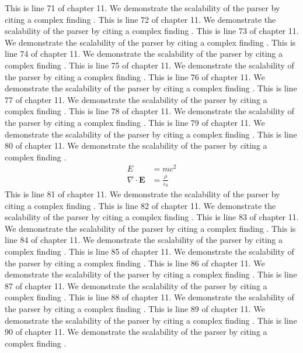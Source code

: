 This is line 71 of chapter 11. We demonstrate the scalability of the parser by citing a complex finding \cite{ref11_71}.
This is line 72 of chapter 11. We demonstrate the scalability of the parser by citing a complex finding \cite{ref11_72}.
This is line 73 of chapter 11. We demonstrate the scalability of the parser by citing a complex finding \cite{ref11_73}.
This is line 74 of chapter 11. We demonstrate the scalability of the parser by citing a complex finding \cite{ref11_74}.
This is line 75 of chapter 11. We demonstrate the scalability of the parser by citing a complex finding \cite{ref11_75}.
This is line 76 of chapter 11. We demonstrate the scalability of the parser by citing a complex finding \cite{ref11_76}.
This is line 77 of chapter 11. We demonstrate the scalability of the parser by citing a complex finding \cite{ref11_77}.
This is line 78 of chapter 11. We demonstrate the scalability of the parser by citing a complex finding \cite{ref11_78}.
This is line 79 of chapter 11. We demonstrate the scalability of the parser by citing a complex finding \cite{ref11_79}.
This is line 80 of chapter 11. We demonstrate the scalability of the parser by citing a complex finding \cite{ref11_80}.
\begin{align*}
  E &= mc^2 \\
  \nabla \cdot \mathbf{E} &= \frac{\rho}{\varepsilon_0}
\end{align*}
This is line 81 of chapter 11. We demonstrate the scalability of the parser by citing a complex finding \cite{ref11_81}.
This is line 82 of chapter 11. We demonstrate the scalability of the parser by citing a complex finding \cite{ref11_82}.
This is line 83 of chapter 11. We demonstrate the scalability of the parser by citing a complex finding \cite{ref11_83}.
This is line 84 of chapter 11. We demonstrate the scalability of the parser by citing a complex finding \cite{ref11_84}.
This is line 85 of chapter 11. We demonstrate the scalability of the parser by citing a complex finding \cite{ref11_85}.
This is line 86 of chapter 11. We demonstrate the scalability of the parser by citing a complex finding \cite{ref11_86}.
This is line 87 of chapter 11. We demonstrate the scalability of the parser by citing a complex finding \cite{ref11_87}.
This is line 88 of chapter 11. We demonstrate the scalability of the parser by citing a complex finding \cite{ref11_88}.
This is line 89 of chapter 11. We demonstrate the scalability of the parser by citing a complex finding \cite{ref11_89}.
This is line 90 of chapter 11. We demonstrate the scalability of the parser by citing a complex finding \cite{ref11_90}.
